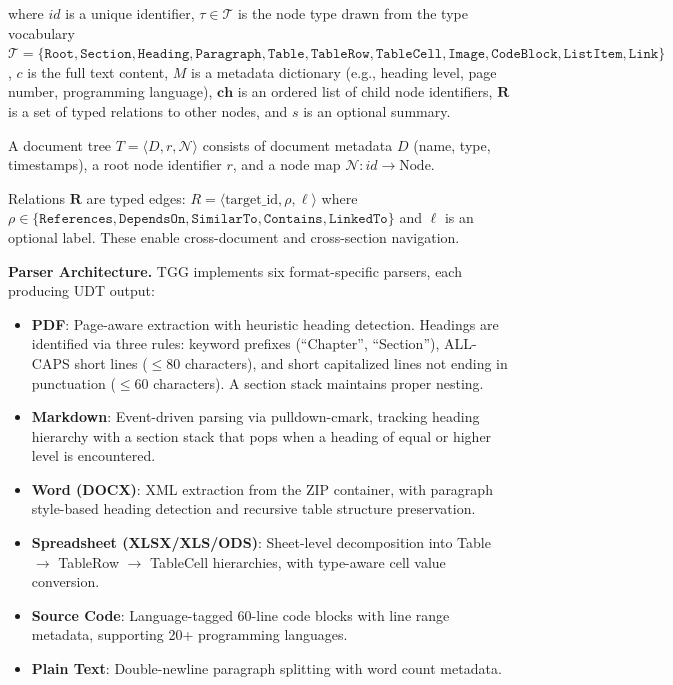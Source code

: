 \documentclass[conference]{IEEEtran}
\begin{document}
\noindent where $id$ is a unique identifier, $\tau \in \mathcal{T}$ is the node type drawn from the type vocabulary $\mathcal{T} = \{\texttt{Root}, \texttt{Section}, \texttt{Heading}, \texttt{Paragraph}, \texttt{Table}, \texttt{TableRow}, \texttt{TableCell}, \texttt{Image}, \texttt{CodeBlock}, \texttt{ListItem}, \texttt{Link}\}$, $c$ is the full text content, $M$ is a metadata dictionary (e.g., heading level, page number, programming language), $\mathbf{ch}$ is an ordered list of child node identifiers, $\mathbf{R}$ is a set of typed relations to other nodes, and $s$ is an optional summary.

A document tree $T = \langle D, r, \mathcal{N} \rangle$ consists of document metadata $D$ (name, type, timestamps), a root node identifier $r$, and a node map $\mathcal{N}: id \rightarrow \text{Node}$.

Relations $\mathbf{R}$ are typed edges: $R = \langle \text{target\_id}, \rho, \ell \rangle$ where $\rho \in \{\texttt{References}, \texttt{DependsOn}, \texttt{SimilarTo}, \texttt{Contains}, \texttt{LinkedTo}\}$ and $\ell$ is an optional label. These enable cross-document and cross-section navigation.

\textbf{Parser Architecture.} TGG implements six format-specific parsers, each producing UDT output:

\begin{itemize}
    \item \textbf{PDF}: Page-aware extraction with heuristic heading detection. Headings are identified via three rules: keyword prefixes (``Chapter'', ``Section''), ALL-CAPS short lines ($\leq 80$ characters), and short capitalized lines not ending in punctuation ($\leq 60$ characters). A section stack maintains proper nesting.
    \item \textbf{Markdown}: Event-driven parsing via pulldown-cmark, tracking heading hierarchy with a section stack that pops when a heading of equal or higher level is encountered.
    \item \textbf{Word (DOCX)}: XML extraction from the ZIP container, with paragraph style-based heading detection and recursive table structure preservation.
    \item \textbf{Spreadsheet (XLSX/XLS/ODS)}: Sheet-level decomposition into Table $\rightarrow$ TableRow $\rightarrow$ TableCell hierarchies, with type-aware cell value conversion.
    \item \textbf{Source Code}: Language-tagged 60-line code blocks with line range metadata, supporting 20+ programming languages.
    \item \textbf{Plain Text}: Double-newline paragraph splitting with word count metadata.
\end{itemize}
\end{document}
